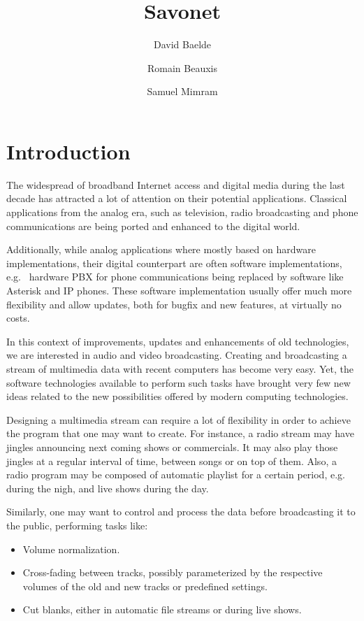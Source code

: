 \documentclass{llncs}
\title{Savonet}
\author{David Baelde \and Romain Beauxis \and Samuel Mimram}
\newcommand{\eg}{e.g.~}
\begin{document}
\maketitle

\section*{Introduction}

The widespread of broadband Internet access and digital media during the last
decade has attracted a lot of attention on their potential applications.
Classical applications from the analog era, such as television, 
radio broadcasting and phone communications are being ported and enhanced to the digital
world.

Additionally, while analog applications where mostly based on hardware implementations,
their digital counterpart are often software implementations, \eg{} hardware PBX for phone
communications being replaced by software like Asterisk and IP phones. These software
implementation usually offer much more flexibility and allow updates, both 
for bugfix and new features, at virtually no costs.

In this context of improvements, updates and enhancements of old technologies, we 
are interested in audio and video broadcasting. Creating and broadcasting 
a stream of multimedia data with recent computers has become very easy.
Yet, the software technologies available to perform such tasks
have brought very few new ideas related to the new possibilities offered
by modern computing technologies.

Designing a multimedia stream can require a lot of flexibility 
in order to achieve the program that one may want to create. For instance,
a radio stream may have jingles announcing next coming shows
or commercials. It may also play those jingles at a regular 
interval of time, between songs or on top of them. Also, a radio program may be 
composed of automatic playlist for a certain period, \eg{} during the nigh, 
and live shows during the day.

Similarly, one may want to control and process the data before broadcasting
it to the public, performing tasks like:
\begin{itemize}
 \item Volume normalization.
 \item Cross-fading between tracks, possibly parameterized by the respective volumes
of the old and new tracks or predefined settings.
 \item Cut blanks, either in automatic file streams or during live shows.
\end{itemize}
\end{document}
